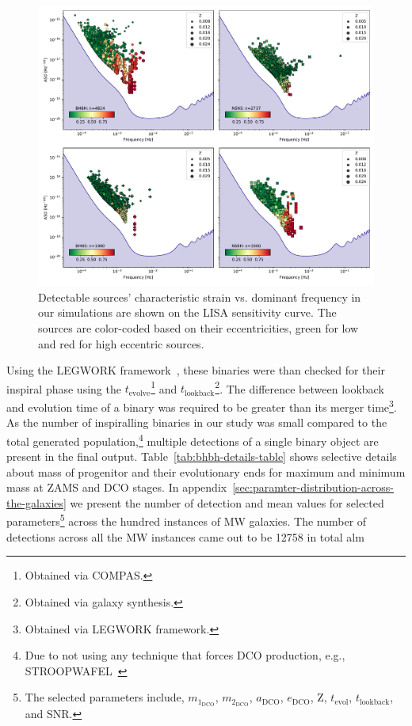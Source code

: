 \documentclass[journal, twocolumn]{IEEEtran}
\newcommand{\mone}[1]{m_{1_{\text{#1}}}}
\newcommand{\mtwo}[1]{m_{2_{\text{#1}}}}
\newcommand{\semaxis}[1]{a_{\text{#1}}}
\newcommand{\ecc}[1]{e_\text{#1}}
\newcommand{\interval}[1]{t_\text{#1}}
\begin{document}
    \begin{figure}[!h]%
        \centering
        \includegraphics[width=\textwidth]{analysis_data/main_analysis_folder/dco_typewise_snr}
        \caption{Detectable sources' characteristic strain vs. dominant frequency in our simulations are shown on the LISA sensitivity curve. The sources are color-coded based on their eccentricities, green for low and red for high eccentric sources.}
        \label{fig:alldcosnrplotting}
    \end{figure}

    Using the LEGWORK framework~\cite{wagg2021legwork}, these binaries were than checked for their inspiral phase using the $\interval{evolve}$\footnote{Obtained via COMPAS.} and $\interval{lookback}$\footnote{Obtained via galaxy synthesis.}.
    The difference between lookback and evolution time of a binary was required to be greater than its merger time\footnote{Obtained via LEGWORK framework.}.
    As the number of inspiralling binaries in our study was small compared to the total generated population,\footnote{Due to not using any technique that forces DCO production, e.g., STROOPWAFEL~\cite{Broekgaarden2019}} multiple detections of a single binary object are present in the final output.
    Table~\ref{tab:bhbh-details-table} shows selective details about mass of progenitor and their evolutionary ends for maximum and minimum mass at ZAMS and DCO stages.
    In appendix~\ref{sec:paramter-distribution-across-the-galaxies} we present the number of detection and mean values for selected parameters\footnote{The selected parameters include, $\mone{DCO}$, $\mtwo{DCO}$, $\semaxis{DCO}$, $\ecc{DCO}$, Z, $\interval{evol}$, $\interval{lookback}$, and SNR.} across the hundred instances of MW galaxies.
    The number of detections across all the MW instances came out to be 12758 in total alm
\end{document}

